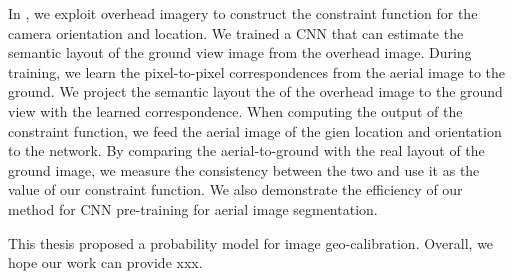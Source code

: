 In , we exploit overhead imagery to construct
the constraint function for the camera orientation and location.
We trained a CNN that can estimate the semantic layout of the ground
view image from the overhead image. During training, we learn the
pixel-to-pixel correspondences from the aerial image to the ground. We
project the semantic layout the of the overhead image to the ground
view with the learned correspondence.
When computing the output of the constraint function, we feed the
aerial image of the gien location and orientation to the network. By
comparing the aerial-to-ground with the real layout of the ground
image, we measure the consistency between the two and use
it as the value of our constraint function.
We also demonstrate the efficiency of our method for CNN pre-training
for aerial image segmentation.

This thesis proposed a probability model for image geo-calibration. 
Overall, we hope our work can provide xxx.
